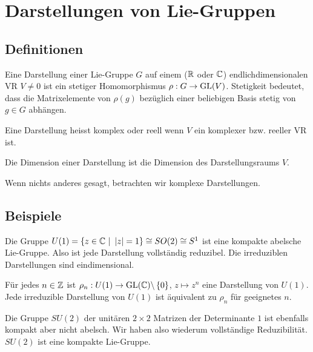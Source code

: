 \section{Darstellungen von Lie-Gruppen}

\subsection{Definitionen}

\begin{definition}
    Eine Darstellung einer Lie-Gruppe $G$ auf einem ($\mathbb{R}$ oder $\mathbb{C}$) endlichdimensionalen
    VR $V \neq 0$ ist ein stetiger Homomorphismus $\rho: G \rightarrow \text{GL}(V)$.
    Stetigkeit bedeutet, dass die Matrixelemente von $\rho(g)$ bezüglich einer
    beliebigen Basis stetig von $g \in G$ abhängen.
\end{definition}

\begin{definition}
    Eine Darstellung heisst komplex oder reell wenn $V$ ein komplexer bzw.
    reeller VR ist.
\end{definition}

\begin{definition}[Dimension]
    Die Dimension einer Darstellung ist die Dimension des Darstellungsraums $V$.
\end{definition}

Wenn nichts anderes gesagt, betrachten wir komplexe Darstellungen.


\subsection{Beispiele}

Die Gruppe $U(1) = \left\{ z \in \mathbb{C} \ | \ \left\vert z \right\vert = 1 \right\} \cong SO(2)
\cong S^1$ ist eine kompakte abelsche Lie-Gruppe. Also ist jede Darstellung
vollständig reduzibel. Die irreduziblen Darstellungen sind eindimensional.

\begin{satz}
    Für jedes $n \in \mathbb{Z}$ ist $\rho_n: U(1) \rightarrow \text{GL}(\mathbb{C}) \backslash \left\{ 0 \right\}$,
    $z \mapsto z^n$ eine Darstellung von $U(1)$. Jede irreduzible Darstellung
    von $U(1)$ ist äquivalent zu $\rho_n$ für geeignetes $n$.
\end{satz}

Die Gruppe $SU(2)$ der unitären $2 \times 2$ Matrizen der Determinante $1$ ist
ebenfalls kompakt aber nicht abelsch. Wir haben also wiederum vollständige
Reduzibilität. $SU(2)$ ist eine kompakte Lie-Gruppe.

